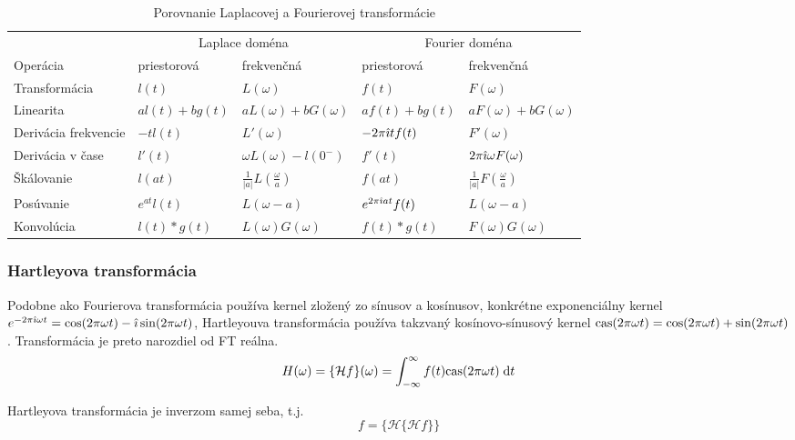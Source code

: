 \begin{sidewaystable}[htp]
    \begin{tabular}{l l l l l}
    & \multicolumn{2}{c}{Laplace doména}
    & \multicolumn{2}{c}{Fourier doména} \\
    Operácia & priestorová& frekvenčná&
        priestorová & frekvenčná \\
    Transformácia &
        $l(t)$ & $L(\omega)$ &
        $f(t)$ & $F(\omega)$ \\
    Linearita &
        $a l(t) + b g(t)$ & $a L(\omega) + b G(\omega)$ &
        $a f(t) + b g(t)$ & $a F(\omega) + b G(\omega)$ \\
    Derivácia frekvencie &
        $-t l(t)$ & $L'(\omega)$ &
        $-2\pi\hat{\imath} t f(t) $ & $F'(\omega)$\\
    Derivácia v čase &
        $l'(t)$ & $\omega L(\omega) - l(0^{-})$ &
        $f'(t)$ & $2\pi\hat{\imath}\omega F(\omega)$\\
    Škálovanie &
        $l(at)$ & $\frac{1}{|a|} L(\frac{\omega}{a})$ &
        $f(at)$ & $\frac{1}{|a|} F(\frac{\omega}{a})$\\
    Posúvanie &
        $e^{a t} l(t)$ & $L(\omega -a)$ &
        $e^{2\pi\hat{\imath} at} f(t)$ & $L(\omega - a)$\\
    Konvolúcia &
        $l(t)*g(t)$ & $L(\omega)G(\omega)$ &
        $f(t)*g(t)$ & $F(\omega)G(\omega)$
    \end{tabular}
    \label{tab:laplace_vs_fourier}
    \caption{Porovnanie Laplacovej a Fourierovej transformácie}
\end{sidewaystable}

\subsubsection{Hartleyova transformácia}
Podobne ako Fourierova transformácia používa kernel zložený zo sínusov
a kosínusov, konkrétne exponenciálny kernel $e^{-2\pi \hat{\imath}\omega t}=
\cos(2\pi \omega t) -\hat{\imath} \sin(2 \pi \omega t)$, Hartleyouva
transformácia používa takzvaný kosínovo-sínusový kernel
\newcommand{\cas}{{\rm cas}}
$\cas(2 \pi \omega t)=\cos(2 \pi \omega t) + \sin(2 \pi \omega t)$.
Transformácia je preto narozdiel od FT reálna.
\begin{equation}
 H(\omega) = \{\mathcal{H} f\}(\omega) =
    \intinfinf f(t) \cas(2 \pi \omega t) \dd t
\end{equation}

Hartleyova transformácia je inverzom samej seba, t.j.
\begin{equation}
    f = \{\mathcal{H}\{\mathcal{H} f\}\}
\end{equation}

